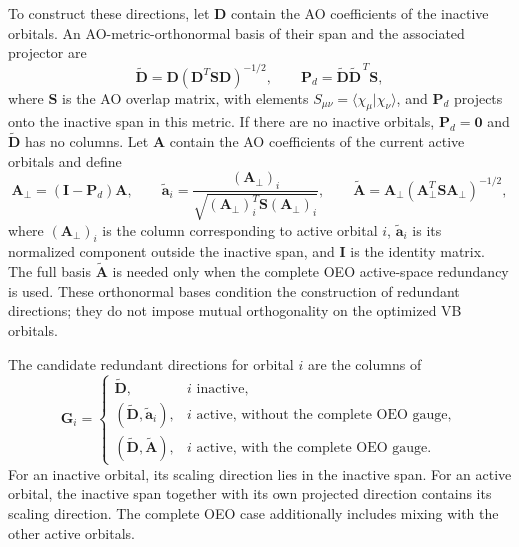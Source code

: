 \documentclass[12pt]{article}
\begin{document}
To construct these directions, let \(\mathbf D\) contain the AO coefficients of the inactive orbitals. An AO-metric-orthonormal basis of their span and the associated projector are
\begin{equation}
 \widetilde{\mathbf D}
 =\mathbf D(\mathbf D^T\mathbf S\mathbf D)^{-1/2},
 \qquad
 \mathbf P_d=\widetilde{\mathbf D}\widetilde{\mathbf D}^{\,T}\mathbf S,
 \label{eq:inactivegauge}
\end{equation}
where \(\mathbf S\) is the AO overlap matrix, with elements \(S_{\mu\nu}=\langle\chi_\mu|\chi_\nu\rangle\), and \(\mathbf P_d\) projects onto the inactive span in this metric. If there are no inactive orbitals, \(\mathbf P_d=\mathbf 0\) and \(\widetilde{\mathbf D}\) has no columns. Let \(\mathbf A\) contain the AO coefficients of the current active orbitals and define
\begin{equation}
 \mathbf A_\perp=(\mathbf I-\mathbf P_d)\mathbf A,\qquad
 \widetilde{\mathbf a}_i=
 \frac{(\mathbf A_\perp)_i}
 {\sqrt{(\mathbf A_\perp)_i^T\mathbf S(\mathbf A_\perp)_i}},
 \qquad
 \widetilde{\mathbf A}
 =\mathbf A_\perp(\mathbf A_\perp^T\mathbf S\mathbf A_\perp)^{-1/2},
 \label{eq:activegauge}
\end{equation}
where \((\mathbf A_\perp)_i\) is the column corresponding to active orbital \(i\), \(\widetilde{\mathbf a}_i\) is its normalized component outside the inactive span, and \(\mathbf I\) is the identity matrix. The full basis \(\widetilde{\mathbf A}\) is needed only when the complete OEO active-space redundancy is used. These orthonormal bases condition the construction of redundant directions; they do not impose mutual orthogonality on the optimized VB orbitals.

The candidate redundant directions for orbital \(i\) are the columns of
\begin{equation}
 \mathbf G_i=
 \begin{cases}
  \widetilde{\mathbf D},&
       i\text{ inactive},\\
  (\widetilde{\mathbf D},\widetilde{\mathbf a}_i),&
       i\text{ active, without the complete OEO gauge},\\
  (\widetilde{\mathbf D},\widetilde{\mathbf A}),&
       i\text{ active, with the complete OEO gauge}.
 \end{cases}
 \label{eq:gaugesources}
\end{equation}
For an inactive orbital, its scaling direction lies in the inactive span. For an active orbital, the inactive span together with its own projected direction contains its scaling direction. The complete OEO case additionally includes mixing with the other active orbitals.
\end{document}
